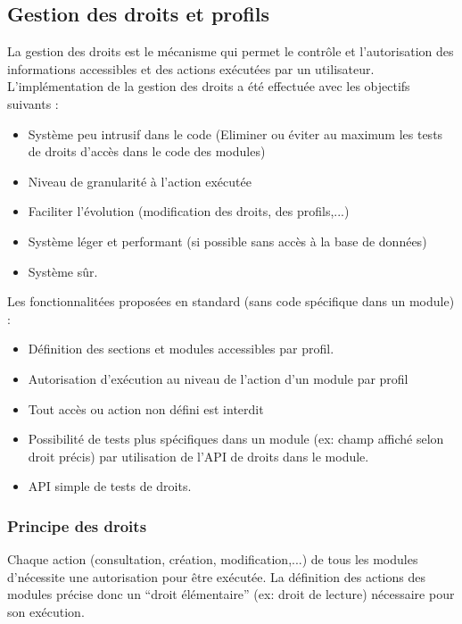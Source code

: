 

\subsection{Gestion des droits et profils}

La gestion des droits est le mécanisme qui permet le contrôle et l'autorisation des informations accessibles et des actions exécutées par un utilisateur.\\

L'implémentation de la gestion des droits a été effectuée avec les objectifs suivants :\\
\begin{itemize}
\item Système peu intrusif dans le code (Eliminer ou éviter au maximum les tests de droits d'accès dans le code des modules)
\item Niveau de granularité à l'action exécutée
\item Faciliter l'évolution (modification des droits, des profils,...)
\item Système léger et performant (si possible sans accès à la base de données)
\item Système sûr.
\end{itemize}
\vspace{0.3cm}

Les fonctionnalitées proposées en standard (sans code spécifique dans un module) :\\
\begin{itemize}
\item Définition des sections et modules accessibles par profil.
\item Autorisation d'exécution au niveau de l'action d'un module par profil
\item Tout accès ou action non défini est interdit
\item Possibilité de tests plus spécifiques dans un module (ex: champ affiché selon droit précis) par utilisation de l'API de droits dans le module.
\item API simple de tests de droits.
\end{itemize}


\subsubsection{Principe des droits}

Chaque action (consultation, création, modification,...) de tous les modules d'\obm nécessite une autorisation pour être exécutée.
La définition des actions des modules précise donc un ``droit élémentaire'' (ex: droit de lecture) nécessaire pour son exécution.\\

